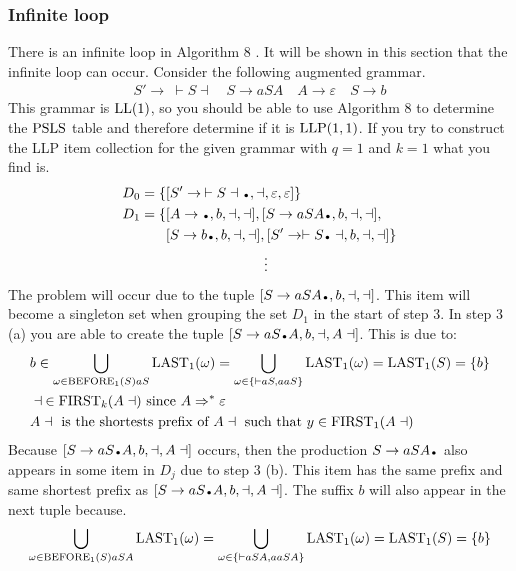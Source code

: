 \subsubsection{Infinite loop}\label{sec:infinite_loop}
There is an infinite loop in Algorithm 8 \cite[13]{Vagner2007}. It will be shown in this section that the infinite loop can occur. Consider the following augmented grammar.
\begin{align*}
    S' \to \: \vdash S \dashv \quad S \to aSA \quad A \to \varepsilon \quad S \to b
\end{align*}
This grammar is $\text{LL}(1)$, so you should be able to use Algorithm 8 to determine the $\text{PSLS}$ table and therefore determine if it is $\text{LLP}(1, 1)$. If you try to construct the LLP item collection for the given grammar with $q = 1$ and $k = 1$ what you find is.
\begin{align*}
    D_0 = \{& [S' \to \: \vdash S \dashv\bigdot, \dashv, \varepsilon, \varepsilon]\} \\
    D_1 = \{& [A \to \bigdot , b, \dashv, \dashv], [S \to a S A\bigdot , b, \dashv, \dashv], \\
    & [S \to b\bigdot , b, \dashv, \dashv],[S' \to \vdash S\bigdot \dashv, b, \dashv, \dashv]\} \\
    & \qquad\qquad\qquad\quad \vdots
\end{align*}
The problem will occur due to the tuple $[S \to a S A\bigdot , b, \dashv, \dashv]$. This item will become a singleton set when grouping the set $D_1$ in the start of step 3. In step 3 (a) you are able to create the tuple $[S \to a S\bigdot A, b, \dashv, A \dashv]$. This is due to:
\begin{align*}
    & b \in \bigcup_{\omega \in \text{BEFORE}_1(S) aS} \text{LAST}_1(\omega) = \bigcup_{\omega \in \{\vdash aS, aaS\}} \text{LAST}_1(\omega) = \text{LAST}_1(S) = \{b\} \\
    & \dashv \: \in \text{FIRST}_k(A\dashv) \text{ since } A \Rightarrow^* \varepsilon \\
    & A\dashv \text{ is the shortests prefix of } A\dashv \text{ such that } y \in \text{FIRST}_1(A\dashv)
\end{align*}
Because $[S \to a S\bigdot A, b, \dashv, A \dashv]$ occurs, then the production $S \to a S A\bigdot$ also appears in some item in $D_j$ due to step 3 (b). This item has the same prefix and same shortest prefix as $[S \to a S\bigdot A, b, \dashv, A \dashv]$. The suffix $b$ will also appear in the next tuple because. 
\begin{align*}
    \bigcup_{\omega \in \text{BEFORE}_1(S) aSA} \text{LAST}_1(\omega) = \bigcup_{\omega \in \{\vdash aSA, aaSA\}} \text{LAST}_1(\omega) = \text{LAST}_1(S) = \{b\}
\end{align*}
